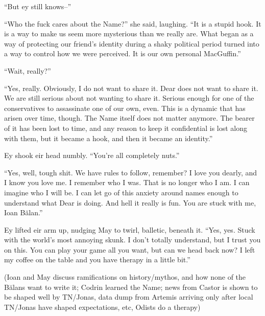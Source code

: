 ``But ey still knows--''

``Who the fuck cares about the Name?'' she said, laughing. ``It is a stupid hook. It is a way to make us seem more mysterious than we really are. What began as a way of protecting our friend's identity during a shaky political period turned into a way to control how we were perceived. It is our own personal MacGuffin.''

``Wait, really?''

``Yes, really. Obviously, I do not want to share it. Dear does not want to share it. We are still serious about not wanting to share it. Serious enough for one of the conservatives to assassinate one of our own, even. This is a dynamic that has arisen over time, though. The Name itself does not matter anymore. The bearer of it has been lost to time, and any reason to keep it confidential is lost along with them, but it became a hook, and then it became an identity.''

Ey shook eir head numbly. ``You're all completely nuts.''

``Yes, well, tough shit. We have rules to follow, remember? I love you dearly, and I know you love me. I remember who I was. That is no longer who I am. I can imagine who I will be. I can let go of this anxiety around names enough to understand what Dear is doing. And hell it really is fun. You are stuck with me, Ioan Bălan.''

Ey lifted eir arm up, nudging May to twirl, balletic, beneath it. ``Yes, yes. Stuck with the world's most annoying skunk. I don't totally understand, but I trust you on this. You can play your game all you want, but can we head back now? I left my coffee on the table and you have therapy in a little bit.''

(Ioan and May discuss ramifications on history/mythos, and how none of the Bălans want to write it; Codrin learned the Name; news from Castor is shown to be shaped well by TN/Jonas, data dump from Artemis arriving only after local TN/Jonas have shaped expectations, etc, Odists do a therapy)
